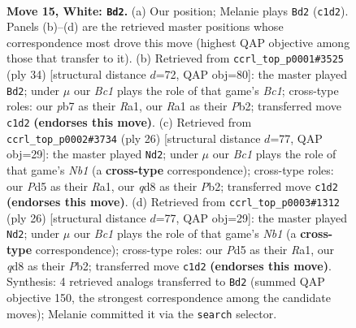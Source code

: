 \documentclass[11pt]{article}
\begin{document}
\clearpage

\begin{figure}[p]\centering
\begin{subfigure}{0.46\textwidth}\centering
\resizebox{\linewidth}{!}{%
\newchessgame
\chessboard[
  setfen={r1bqn1k1/pppp1ppp/8/2bP4/8/2N4P/PPP2PP1/R1B1QBK1 w - - 1 15},
  showmover=false,
  pgfstyle=straightmove, color=movearrow, markmove={c1-d2}
]}
\caption{}
\end{subfigure}\hfill
\begin{subfigure}{0.46\textwidth}\centering
\resizebox{\linewidth}{!}{%
\newchessgame
\chessboard[
  setfen={r1bn2k1/pp2qppp/4p3/2b5/2P1B3/5N2/PP2QPPP/R1B3K1 w - - 0 18},
  showmover=false,
  pgfstyle=straightmove, color=movearrow, markmove={c1-d2}
]}
\caption{}
\end{subfigure}
\\[4pt]
\begin{subfigure}{0.46\textwidth}\centering
\resizebox{\linewidth}{!}{%
\newchessgame
\chessboard[
  setfen={r1bqn1k1/ppp2ppp/5b2/3p4/3P1B2/4Q3/PPP2PPP/RN3BK1 w - - 0 14},
  showmover=false,
  pgfstyle=straightmove, color=movearrow, markmove={b1-d2}
]}
\caption{}
\end{subfigure}\hfill
\begin{subfigure}{0.46\textwidth}\centering
\resizebox{\linewidth}{!}{%
\newchessgame
\chessboard[
  setfen={r1bqn1k1/ppp2ppp/5b2/3p4/3P1B2/4Q3/PPP2PPP/RN3BK1 w - - 0 14},
  showmover=false,
  pgfstyle=straightmove, color=movearrow, markmove={b1-d2}
]}
\caption{}
\end{subfigure}
\caption{\textbf{Move 15, White: \texttt{Bd2}.} (a) Our position; Melanie plays \texttt{Bd2} (\texttt{c1d2}). Panels (b)--(d) are the retrieved master positions whose correspondence most drove this move (highest QAP objective among those that transfer to it). (b) Retrieved from \texttt{ccrl\_top\_p0001\#3525} (ply 34) [structural distance $d$=72, QAP obj=80]: the master played \texttt{Bd2}; under $\mu$ our \emph{Bc1} plays the role of that game's \emph{Bc1}; cross-type roles: our \emph{p}b7 as their \emph{R}a1, our \emph{R}a1 as their \emph{P}b2; transferred move \texttt{c1d2} \textbf{(endorses this move)}. (c) Retrieved from \texttt{ccrl\_top\_p0002\#3734} (ply 26) [structural distance $d$=77, QAP obj=29]: the master played \texttt{Nd2}; under $\mu$ our \emph{Bc1} plays the role of that game's \emph{Nb1} (a \textbf{cross-type} correspondence); cross-type roles: our \emph{P}d5 as their \emph{R}a1, our \emph{q}d8 as their \emph{P}b2; transferred move \texttt{c1d2} \textbf{(endorses this move)}. (d) Retrieved from \texttt{ccrl\_top\_p0003\#1312} (ply 26) [structural distance $d$=77, QAP obj=29]: the master played \texttt{Nd2}; under $\mu$ our \emph{Bc1} plays the role of that game's \emph{Nb1} (a \textbf{cross-type} correspondence); cross-type roles: our \emph{P}d5 as their \emph{R}a1, our \emph{q}d8 as their \emph{P}b2; transferred move \texttt{c1d2} \textbf{(endorses this move)}. Synthesis: 4 retrieved analogs transferred to \texttt{Bd2} (summed QAP objective 150, the strongest correspondence among the candidate moves); Melanie committed it via the \texttt{search} selector.}
\label{fig:thought-m28}
\end{figure}
\end{document}

